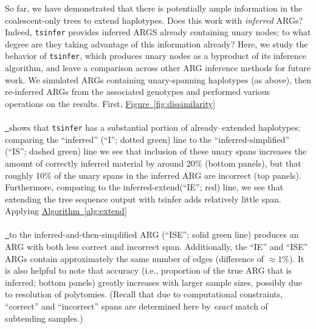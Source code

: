 \documentclass[10pt,twoside,lineno]{gsajnl}
\newcommand{\tsinfer}{\texttt{tsinfer}}
\newcommand{\algorithmref}[2][]{%
	\hyperref[{#2}]{%
		Algorithm~\ref*{#2}%
		\ifx\\#1\\%
		\else
		\,#1%
		\fi
	}%
}
\newcommand*{\figref}[2][]{%
	\hyperref[{#2}]{%
		Figure~\ref*{#2}%
		\ifx\\#1\\%
		\else
		\,#1%
		\fi
	}%
}
\begin{document}
So far, we have demonstrated that there is potentially ample information
in the coalescent-only trees to extend haplotypes.
Does this work with \emph{inferred} ARGs?
Indeed, \tsinfer{} provides inferred ARGS already containing unary nodes;
to what degree are they taking advantage of this information already?
Here, we study the behavior of \tsinfer{}, which produces unary nodes as a
byproduct of its inference algorithm,
and leave a comparison across other ARG inference methods for future work.
We simulated ARGs containing unary-spanning haplotypes (as above), then
re-inferred ARGs from the associated genotypes and performed various operations
on the results.
First, \figref{fig:dissimilarity} shows that \tsinfer{}
has a substantial portion of already--extended haplotypes:
comparing the ``inferred'' (``I''; dotted green) line to the ``inferred-simplified'' (``IS''; dashed green) line
we see that inclusion of these unary spans increases the amount of correctly inferred material
by around 20\% (bottom panels),
but that roughly 10\% of the unary spans in the inferred ARG are incorrect (top panels).
Furthermore, comparing to the inferred-extend(``IE''; red) line, we see that extending the tree sequence output with tsinfer adds relatively little span.
Applying \algorithmref{alg:extend} to the inferred-and-then-simplified ARG
(``ISE''; solid green line)
produces an ARG with both less correct and incorrect span.
Additionally, the ``IE'' and ``ISE'' ARGs 
contain approximately the same number of edges (difference of $\approx 1\%$).
It is also helpful to note that accuracy
(i.e., proportion of the true ARG that is inferred; bottom panels)
greatly increases with larger sample sizes,
possibly due to resolution of polytomies.
(Recall that due to computational constraints,
``correct'' and ``incorrect'' spans are determined here by \emph{exact} match
of subtending samples.)

%    
%
\end{document}

